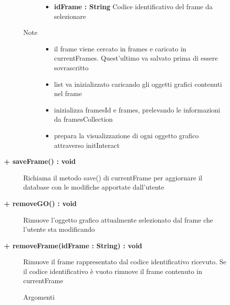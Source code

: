 \begin{description}
\begin{description}
\begin{description}
\begin{itemize}
					\item \textbf{idFrame : String	} \hfill
					Codice identificativo del frame da selezionare			
				\end{itemize}
			
			\item[Note] \hfill
			\begin{itemize}
					\item il frame viene cercato in frames e caricato in currentFrames. Quest'ultimo va salvato prima di essere sovrascritto
					\item list va inizializzato caricando gli oggetti grafici contenuti nel frame
					\item inizializza framesId e frames, prelevando le informazioni da framesCollection
					\item prepara la visualizzazione di ogni oggetto grafico attraverso initInteract
			\end{itemize}
				
		\end{description}
	\end{description}
	
	
	\begin{description}
		\item[\textbf{\color{blue} + saveFrame() : void	}] \hfill
			Richiama il metodo save() di currentFrame per aggiornare il database con le modifiche apportate dall'utente
		
	\end{description}
	
	\begin{description}
		\item[\textbf{\color{blue}+ removeGO() : void	}] \hfill
			Rimuove l'oggetto grafico attualmente selezionato dal frame che l'utente sta modificando
		
	\end{description}
	
	
	\begin{description}
		\item[\textbf{\color{blue}+ removeFrame(idFrame : String) : void 	}] \hfill
			Rimuove il frame rappresentato dal codice identificativo ricevuto. Se il codice identificativo è vuoto rimuove il frame contenuto in currentFrame
			
		\begin{description}
			\item[Argomenti] \hfill
				\begin{itemize}
				

\end{itemize}
\end{description}
\end{description}
\end{description}
